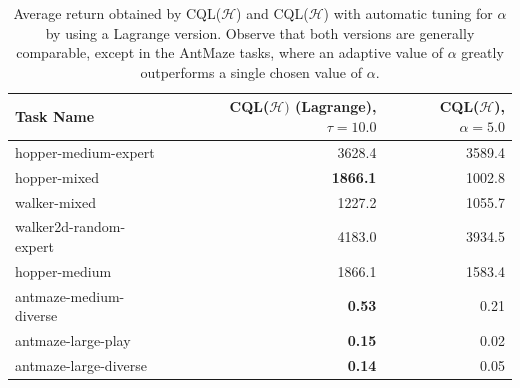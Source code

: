 \begin{table}[h]
    \centering
    \begin{tabular}{l|r|r}
    \hline
        \textbf{Task Name} & \textbf{CQL($\mathcal{H})$ (Lagrange), $\tau = 10.0$} & \textbf{CQL($\mathcal{H}$), $\alpha = 5.0$}  \\
        \hline
        hopper-medium-expert & 3628.4 & 3589.4\\
        hopper-mixed & {\textbf{1866.1}} & 1002.8 \\
        walker-mixed & {1227.2} & 1055.7 \\
        walker2d-random-expert & 4183.0 & 3934.5 \\ 
        hopper-medium & 1866.1 & 1583.4 \\ \hline \hline
        antmaze-medium-diverse & \textbf{0.53} & 0.21 \\
        antmaze-large-play & \textbf{0.15} & 0.02 \\
        antmaze-large-diverse & \textbf{0.14}  & 0.05 \\
        \hline
    \end{tabular}
    \caption{{\small Average return obtained by CQL($\mathcal{H}$) and CQL($\mathcal{H}$) with automatic tuning for $\alpha$ by using a Lagrange version. Observe that both versions are generally comparable, except in the AntMaze tasks, where an adaptive value of $\alpha$ greatly outperforms a single chosen value of $\alpha$.}}
    \label{table:lagrangian}
    \vspace{-15pt}
\end{table}


